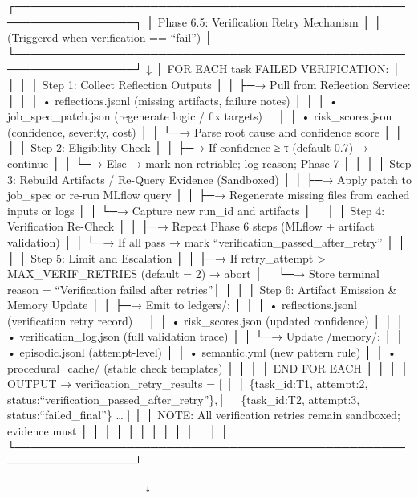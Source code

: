 \documentclass[
]{article}
\begin{document}
┌─────────────────────────────────────────────────────────────────┐ │
Phase 6.5: Verification Retry Mechanism │ │ (Triggered when verification
== ``fail'') │
└─────────────────────────────────────────────────────────────────┘ ↓ │
FOR EACH task FAILED VERIFICATION: │ │ │ │ Step 1: Collect Reflection
Outputs │ │ ├─→ Pull from Reflection Service: │ │ │ • reflections.jsonl
(missing artifacts, failure notes) │ │ │ • job\_spec\_patch.json
(regenerate logic / fix targets) │ │ │ • risk\_scores.json (confidence,
severity, cost) │ │ └─→ Parse root cause and confidence score │ │ │ │
Step 2: Eligibility Check │ │ ├─→ If confidence ≥ τ (default 0.7) →
continue │ │ └─→ Else → mark non-retriable; log reason; Phase 7 │ │ │ │
Step 3: Rebuild Artifacts / Re-Query Evidence (Sandboxed) │ │ ├─→ Apply
patch to job\_spec or re-run MLflow query │ │ ├─→ Regenerate missing
files from cached inputs or logs │ │ └─→ Capture new run\_id and
artifacts │ │ │ │ Step 4: Verification Re-Check │ │ ├─→ Repeat Phase 6
steps (MLflow + artifact validation) │ │ └─→ If all pass → mark
``verification\_passed\_after\_retry'' │ │ │ │ Step 5: Limit and
Escalation │ │ ├─→ If retry\_attempt \textgreater{} MAX\_VERIF\_RETRIES
(default = 2) → abort │ │ └─→ Store terminal reason = ``Verification
failed after retries''│ │ │ │ Step 6: Artifact Emission \& Memory Update
│ │ ├─→ Emit to ledgers/: │ │ │ • reflections.jsonl (verification retry
record) │ │ │ • risk\_scores.json (updated confidence) │ │ │ •
verification\_log.json (full validation trace) │ │ └─→ Update /memory/:
│ │ • episodic.jsonl (attempt-level) │ │ • semantic.yml (new pattern
rule) │ │ • procedural\_cache/ (stable check templates) │ │ │ │ END FOR
EACH │ │ │ │ OUTPUT → verification\_retry\_results = {[} │ │
\{task\_id:T1, attempt:2,
status:``verification\_passed\_after\_retry''\},│ │ \{task\_id:T2,
attempt:3, status:``failed\_final''\} \ldots{} {]} │ │ NOTE: All
verification retries remain sandboxed; evidence must │ │ │ │ │ │ │ │ │ │
│ │ │
└─────────────────────────────────────────────────────────────────┘

\begin{verbatim}
                        ↓
\end{verbatim}
\end{document}
